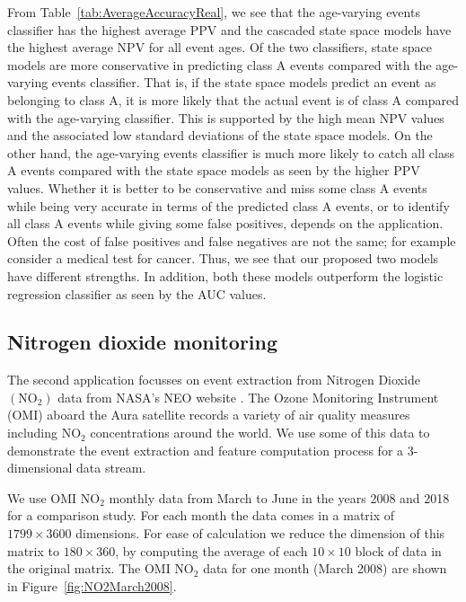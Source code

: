 \documentclass[a4paper,11pt]{article}
\begin{document}
From Table~\ref{tab:AverageAccuracyReal}, we see that the age-varying events classifier has the highest average PPV and the cascaded state space models have the highest average NPV for all event ages. Of the two classifiers, state space models are more conservative in predicting class A events compared with the age-varying events classifier. That is, if the state space models predict an event as belonging to class A, it is more likely that the actual event is of class A compared with the age-varying classifier. This is supported by the high mean NPV values and the associated low standard deviations of the state space models. On the other hand, the age-varying events classifier is much more likely to catch all class A events compared with the state space models as seen by the higher PPV values. Whether it is better to be conservative and miss some class A events while being very accurate in terms of the predicted class A events, or to identify all class A events while giving some false positives, depends on the application. Often the cost of  false positives and false negatives are not the same; for example consider a medical test for cancer. Thus, we see that our proposed two models have different strengths. In addition, both these models outperform the logistic regression classifier as seen by the AUC values.  

\newpage
\subsection{Nitrogen dioxide monitoring}

The second application focusses on event extraction from Nitrogen Dioxide $(\text{NO}_2)$ data from NASA's NEO website \cite{OMINO2}. The Ozone Monitoring Instrument (OMI) \cite{levelt2006ozone} aboard the Aura satellite records a variety of air quality measures including $\text{NO}_2$ concentrations around the world. We use some of this data to demonstrate the event extraction and feature computation process for a 3-dimensional data stream.

We use OMI $\text{NO}_2$ monthly data from March to June in the years 2008 and 2018 for a comparison study. For each month the data comes in a matrix of $1799 \times 3600$ dimensions. For ease of calculation we reduce the dimension of this matrix to $180 \times 360 $, by computing the average of each $10 \times 10$ block of data in the original matrix. The OMI $\text{NO}_2$ data for one month (March 2008) are shown in Figure~\ref{fig:NO2March2008}.
\end{document}
